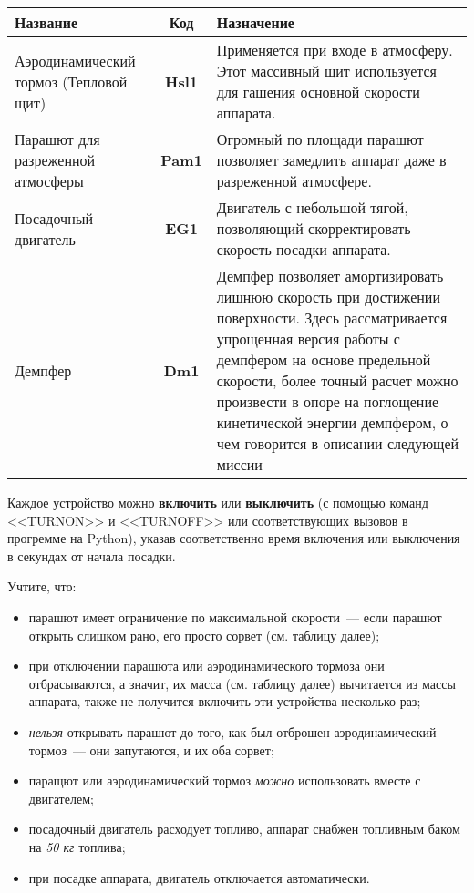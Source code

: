 \documentclass[12pt,a4paper]{article}
\begin{document}
\begin{center}
\begin{tabular}{ |p{5cm}|c|p{8.5cm}| } 
  \hline
  \textbf{Название} & \textbf{Код} & \textbf{Назначение} \\
  \hline
  Аэродинамический тормоз (Тепловой щит) & \textbf{Hsl1} & Применяется при входе в
  атмосферу. Этот массивный щит используется для гашения основной скорости аппарата. \\
  \hline
  Парашют для разреженной атмосферы & \textbf{Pam1} & Огромный по площади парашют
  позволяет замедлить аппарат даже в разреженной атмосфере.\\ 
  \hline
  Посадочный двигатель & \textbf{EG1} & Двигатель с небольшой тягой, позволяющий
  скорректировать скорость посадки аппарата. \\
  \hline
  Демпфер & \textbf{Dm1} & Демпфер позволяет амортизировать лишнюю скорость при достижении
  поверхности. Здесь рассматривается упрощенная версия работы с демпфером на основе
  предельной скорости, более точный расчет можно
    произвести в опоре на поглощение кинетической энергии демпфером, о чем говорится в
    описании следующей миссии\\
  \hline
\end{tabular}
\end{center}

Каждое устройство можно \textbf{включить} или \textbf{выключить} (с помощью команд
<<TURNON>> и <<TURNOFF>> или соответствующих вызовов в прогремме на Python), указав
соответственно время включения или выключения в секундах от начала посадки.

Учтите, что:

\begin{itemize}
  \item парашют имеет ограничение по максимальной скорости~--- если парашют открыть
    слишком рано, его просто сорвет (см. таблицу далее);
  \item при отключении парашюта или аэродинамического тормоза они отбрасываются, а значит,
    их масса (см. таблицу далее) вычитается из массы аппарата, также не получится включить
    эти устройства несколько раз;
  \item \emph{нельзя} открывать парашют до того, как был отброшен аэродинамический тормоз~--- они
    запутаются, и их оба сорвет;
  \item паращют или аэродинамический тормоз \emph{можно} использовать вместе с двигателем;
  \item посадочный двигатель расходует топливо, аппарат снабжен топливным баком на
    \emph{50 кг} топлива;
  \item при посадке аппарата, двигатель отключается автоматически.
\end{itemize}
\end{document}
